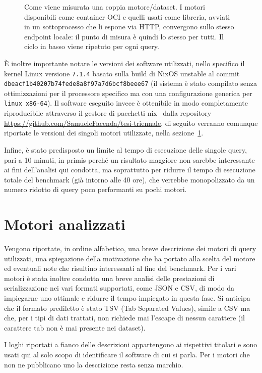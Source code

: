 \begin{figure}[htb]
  \centering
  
  \caption{Come viene misurata una coppia motore/dataset. I motori disponibili come container OCI e quelli usati come libreria, avviati in un sottoprocesso che li espone via HTTP, convergono sullo stesso endpoint locale: il punto di misura è quindi lo stesso per tutti. Il ciclo in basso viene ripetuto per ogni query.}
  \label{fig:pipeline}
\end{figure}
\par È inoltre importante notare le versioni dei software utilizzati, nello specifico il kernel Linux versione \texttt{7.1.4} basato sulla
build di NixOS unstable al commit \texttt{dbeacf1b40207b74fede8a8f97a7d6bcf8beee67} (il sistema è stato compilato senza ottimizzazioni
per il processore specifico ma con una configurazione generica per \texttt{linux x86-64}). Il software eseguito invece è ottenibile in
modo completamente riproducibile attraverso il gestore di pacchetti nix~\cite{dolstra2010nixos} dalla repository
\url{https://github.com/SamueleFacenda/tesi-triennale}, di seguito verranno comunque riportate le versioni dei singoli motori
utilizzate, nella sezione~\ref{sec:engines}.
\par Infine, è stato predisposto un limite al tempo di esecuzione delle singole query, pari a 10 minuti, in primis perché un risultato
maggiore non sarebbe interessante ai fini dell'analisi qui condotta, ma soprattutto per ridurre il tempo di esecuzione totale
del benchmark (già intorno alle 40 ore), che verrebbe monopolizzato da un numero ridotto di query poco performanti
su pochi motori.

\section{Motori analizzati}
\label{sec:engines}

Vengono riportate, in ordine alfabetico, una breve descrizione dei motori di query utilizzati, una spiegazione della motivazione
che ha portato alla scelta del motore ed eventuali note che risultino interessanti al fine del benchmark.
Per i vari motori è stata inoltre condotta una breve analisi delle prestazioni di serializzazione nei vari formati 
supportati, come JSON e CSV, di modo da impiegarne uno ottimale e ridurre il tempo impiegato in questa fase. 
Si anticipa che il formato prediletto è stato TSV (Tab Separated Values), simile a CSV ma che, per i tipi di dati trattati,
non richiede mai l'escape di nessun carattere (il carattere tab non è mai presente nei dataset).
\par I loghi riportati a fianco delle descrizioni appartengono ai rispettivi titolari e sono usati qui
al solo scopo di identificare il software di cui si parla. Per i motori che non ne pubblicano uno la
descrizione resta senza marchio.

